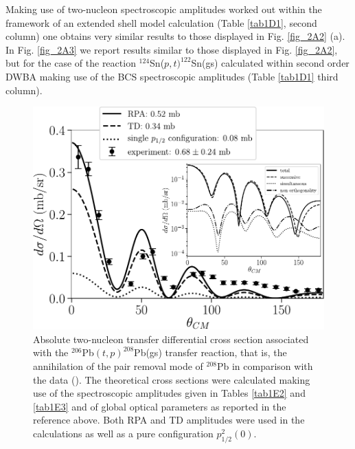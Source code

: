  Making use of two-nucleon spectroscopic amplitudes worked out within the framework of an extended shell model calculation (Table \ref{tab1D1}, second column) one obtains very similar results to those displayed in Fig. \ref{fig_2A2} (a). In Fig. \ref{fig_2A3} we report results similar to those displayed in Fig. \ref{fig_2A2}, but for the case of the reaction $^{124}$Sn($p,t)^{122}$Sn(gs) calculated within second order DWBA making use of the BCS spectroscopic amplitudes (Table \ref{tab1D1} third column). 


    \begin{figure}
    \centerline{\includegraphics*[width=15cm,angle=0]{nutshell/figs/tp_Pb_contributions-v2.pdf}}
    \caption{Absolute two-nucleon transfer differential cross section associated with the $^{206}$Pb$(t,p)^{208}$Pb(gs) transfer reaction, that is, the annihilation of the pair removal mode of $^{208}$Pb in comparison with the data (\cite{Bjerregaard:66b}). The theoretical cross sections were calculated making use of the spectroscopic amplitudes given in Tables \ref{tab1E2} and \ref{tab1E3} and of global optical parameters as reported in the reference above. Both  RPA and TD amplitudes were used in the calculations as well as a pure configuration $p_{1/2}^2(0)$. 
    }\label{fig2A4}
    \end{figure}

